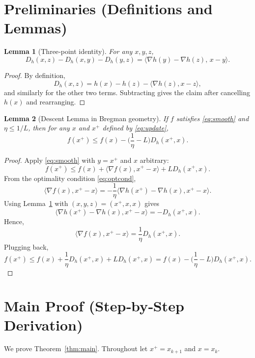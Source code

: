 \documentclass{article}
\newtheorem{lemma}{Lemma}
\newcommand{\breg}[2]{D_h(#1,#2)}
\begin{document}
\newpage
\section*{Preliminaries (Definitions and Lemmas)}
\begin{lemma}[Three‑point identity]\label{lem:three}
For any $x,y,z$,
\[
\breg{x}{z}-\breg{x}{y}-\breg{y}{z}
=
\langle\nabla h(y)-\nabla h(z),\,x-y\rangle .
\]
\end{lemma}
\begin{proof}
By definition,
\[
\breg{x}{z}=h(x)-h(z)-\langle\nabla h(z),x-z\rangle,
\]
and similarly for the other two terms. Subtracting gives the claim after cancelling $h(x)$ and rearranging. \hfill\qedsymbol
\end{proof}

\begin{lemma}[Descent Lemma in Bregman geometry]\label{lem:descent}
If $f$ satisfies \eqref{eq:smooth} and $\eta\le 1/L$, then for any $x$ and $x^{+}$ defined by \eqref{eq:update},
\[
f(x^{+})\le f(x)-\Big(\frac{1}{\eta}-L\Big)\breg{x^{+}}{x}.
\]
\end{lemma}
\begin{proof}
Apply \eqref{eq:smooth} with $y=x^{+}$ and $x$ arbitrary:
\[
f(x^{+})\le f(x)+\langle\nabla f(x),x^{+}-x\rangle+L\breg{x^{+}}{x}.
\]
From the optimality condition \eqref{eq:optcond},
\[
\langle\nabla f(x),x^{+}-x\rangle
= -\frac{1}{\eta}\langle\nabla h(x^{+})-\nabla h(x),x^{+}-x\rangle.
\]
Using Lemma~\ref{lem:three} with $(x,y,z)=(x^{+},x,x)$ gives
\[
\langle\nabla h(x^{+})-\nabla h(x),x^{+}-x\rangle
= -\breg{x^{+}}{x}.
\]
Hence,
\[
\langle\nabla f(x),x^{+}-x\rangle = \frac{1}{\eta}\breg{x^{+}}{x}.
\]
Plugging back,
\[
f(x^{+})\le f(x)+\frac{1}{\eta}\breg{x^{+}}{x}+L\breg{x^{+}}{x}
= f(x)-\Big(\frac{1}{\eta}-L\Big)\breg{x^{+}}{x}.
\]
\hfill\qedsymbol
\end{proof}

\section*{Main Proof (Step‑by‑Step Derivation)}
We prove Theorem~\ref{thm:main}. Throughout let $x^{+}=x_{k+1}$ and $x=x_k$.
\end{document}
